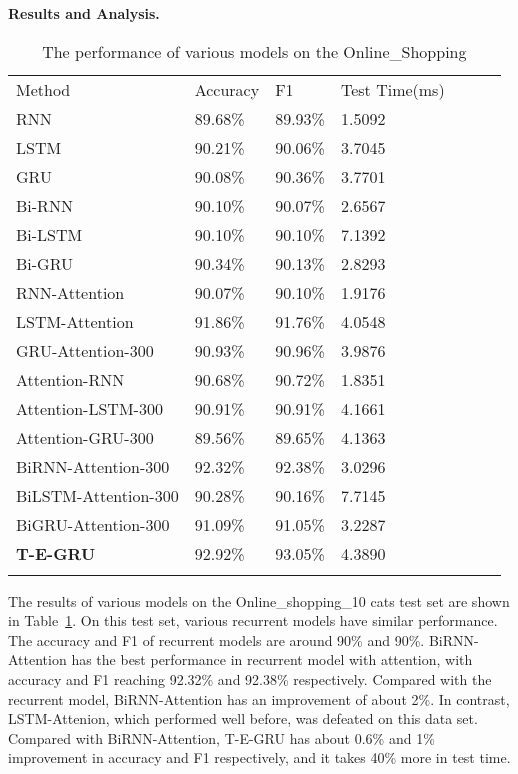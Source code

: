 \textbf{Results and Analysis.}
\begin{table}
	\caption{The performance of various models on the Online\_Shopping}
	\label{tab:OnlineShopping-Result}       
	\begin{tabular}{lllllll}
		\hline\noalign{\smallskip}
		Method 						& Accuracy 	    	&F1		            &Test Time(ms)\\
		\noalign{\smallskip}\hline\noalign{\smallskip}
	    RNN	 						&89.68\%            &89.93\%            &1.5092\\
		LSTM						&90.21\%            &90.06\%            &3.7045\\
		GRU	 						&90.08\%            &90.36\%            &3.7701\\
		Bi-RNN					    &90.10\%            &90.07\%            &2.6567\\
		Bi-LSTM						&90.10\%            &90.10\%            &7.1392\\
		Bi-GRU						&90.34\%            &90.13\%            &2.8293\\
		\noalign{\smallskip}\hline\noalign{\smallskip}
		RNN-Attention				&90.07\%			&90.10\%	        &1.9176\\
		LSTM-Attention				&91.86\%	        &91.76\%	        &4.0548\\
		GRU-Attention-300			&90.93\%			&90.96\%	        &3.9876\\
		Attention-RNN				&90.68\%			&90.72\%	        &1.8351\\
		Attention-LSTM-300			&90.91\%			&90.91\%	        &4.1661\\
		Attention-GRU-300			&89.56\%			&89.65\%	        &4.1363\\
	    BiRNN-Attention-300		    &92.32\%	        &92.38\%	        &3.0296\\
		BiLSTM-Attention-300		&90.28\%			&90.16\%	        &7.7145\\
		BiGRU-Attention-300			&91.09\%			&91.05\%	        &3.2287\\
		\noalign{\smallskip}\hline\noalign{\smallskip}
		\textbf{T-E-GRU}		    &92.92\%	        &93.05\%	        &4.3890\\
		\noalign{\smallskip}\hline
	\end{tabular}
\end{table}
The results of various models on the Online\_shopping\_10 cats test set are shown in Table~\ref{tab:OnlineShopping-Result}. On this test set, various recurrent models have similar performance. The accuracy and F1 of recurrent models are around 90\% and 90\%. BiRNN-Attention has the best performance in recurrent model with attention, with accuracy and F1 reaching 92.32\% and 92.38\% respectively. Compared with the recurrent model, BiRNN-Attention has an improvement of about 2\%. In contrast, LSTM-Attenion, which performed well before, was defeated on this data set. Compared with BiRNN-Attention, T-E-GRU has about 0.6\% and 1\% improvement in accuracy and F1 respectively, and it takes 40\% more in test time.


